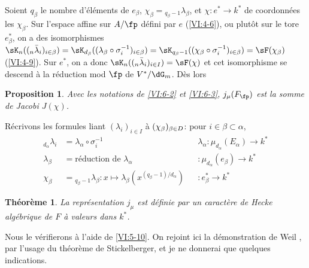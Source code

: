 \documentclass[oneside]{book}
\theoremstyle{sga-source}
\theoremstyle{sga-source-dash}
\theoremstyle{sga-source-dotdash}
\theoremstyle{sga-source-number-note-dash}
\theoremstyle{sga-source-note-number-dotdash}
\theoremstyle{sga-source-example-dotdash}
\theoremstyle{sga-source-inline-number}
\theoremstyle{sga-source-bare-number}
\theoremstyle{sga-source}
\newtheorem{theorem_}[subsection]{Théorème}
\newtheorem{proposition_}[subsection]{Proposition}
\begin{document}
Soient $q_\beta$ le nombre d'éléments de $e_\beta$, 
$\chi_\beta={}_{q_\beta-1}\lambda_\beta$, et 
$\chi:e^\ast \to k^\ast$ de coordonnées les $\chi_\beta$. Sur l'espace 
affine sur $A/\fp$ défini par $e$ (\ref{VI:4-6}), ou plutôt sur le tore 
$e_\beta^\ast$, on a des isomorphismes 
$\sK_n((_n\bar\lambda_i)_{i\in\beta}) = \sK_{d_\beta}((\lambda_\beta \circ \sigma_i^{-1})_{i\in\beta}) =\sK_{q_\beta-1}(\var{(\chi_\beta\circ \sigma_i^{-1})_{i\in I}}{(\chi_\beta\circ \sigma_i^{-1})_{i\in\beta}}{S45-SOL-0903}) = \sF(\chi_\beta)$ (\ref{VI:4-9}). 
Sur $e^\ast$, on a donc $\var{\sK_n((_n\bar\lambda_i)_{i\in \beta}) = \sF(\chi)}{\sK_n((_n\bar\lambda_i)_{i\in I}) = \sF(\chi)}{S45-SOL-0904}$ 
et cet isomorphisme se descend à la réduction mod $\fp$ de $V^\ast/\dG_m$. 
Dès lors





\begin{proposition_}\label{VI:6-4}
Avec les notations de \ref{VI:6-2} et \ref{VI:6-3}, $j_\mu(F_\fp)$ est la 
somme de Jacobi $J(\chi)$. 
\end{proposition_}

Récrivons les formules liant $(\lambda_i)_{i\in I}$ à 
$\var{(\chi_\beta)_{\beta\in B}}{(\chi_\beta)_{\beta\in D}}{S45-SOL-0906}$: pour $i\in \beta\subset \alpha$, 
\begin{align*}
  _{d_\alpha} \lambda_i &= \lambda_\alpha\circ \sigma_i^{-1} && \lambda_\alpha:\mu_{d_\alpha}(E_\alpha) \to k^\ast \\
  \lambda_\beta &= \text{réduction de $\lambda_\alpha$} && :\mu_{d_\alpha}(e_\beta) \to k^\ast \\
  \chi_\beta &= {}_{q_\beta-1}\lambda_\beta: x\mapsto \lambda_\beta(x^{(q_\beta-1)/d_\alpha}) && :e_\beta^\ast \to k^\ast 
\end{align*}





\begin{theorem_}\label{VI:6-5}
La représentation $j_\mu$ est définie par un caractère de Hecke 
algébrique de $F$ à valeurs dans $k^\ast$. 
\end{theorem_}

Nous le vérifierons à l'aide de \ref{VI:5-10}. On rejoint ici la 
démonstration de Weil \cite{we52,we74-2}, par l'usage du théorème de 
Stickelberger, et je ne donnerai que quelques indications. 





\subsection{}\label{VI:6-6}
\end{document}
